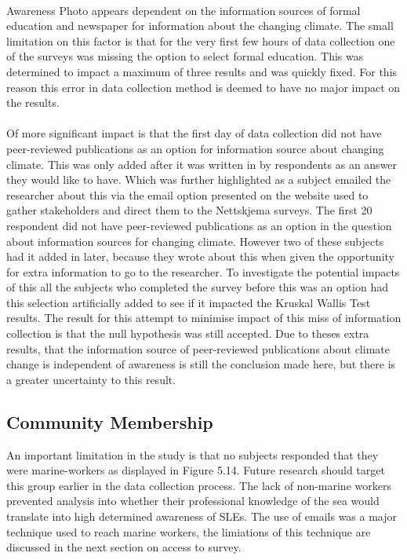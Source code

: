 \paragraph{}
Awareness Photo appears dependent on the information sources of formal education and newspaper for information about the changing climate. The small limitation on this factor is that for the very first few hours of data collection one of the surveys was missing the option to select formal education. This was determined to impact a maximum of three results and was quickly fixed. For this reason this error in data collection method is deemed to have no major impact on the results. 
\paragraph{}
Of more significant impact is that the first day of data collection did not have peer-reviewed publications as an option for information source about changing climate. This was only added after it was written in by respondents as an answer they would like to have. Which was further highlighted as a subject emailed the researcher about this via the email option presented on the website used to gather stakeholders and direct them to the Nettskjema surveys.  The first 20 respondent did not have peer-reviewed publications as an option in the question about information sources for changing climate. However two of these subjects had it added in later, because they wrote about this when given the opportunity for extra information to go to the researcher. To investigate the potential impacts of this all the subjects who completed the survey before this was an option had this selection artificially added to see if it impacted the Kruskal Wallis Test results. The result for this attempt to minimise impact of this miss of information collection is that the null hypothesis was still accepted. Due to theses extra results, that the information source of peer-reviewed publications about climate change is independent of awareness is still the conclusion made here, but there is a greater uncertainty to this result.
\paragraph{}


\subsection{Community Membership}
An important limitation in the study is that no subjects responded that they were marine-workers as displayed in Figure 5.14. Future research should target this group earlier in the data collection process. The lack of non-marine workers prevented analysis into whether their professional knowledge of the sea would translate into high determined awareness of SLEs. The use of emails was a major technique used to reach marine workers, the limiations of this technique are discussed in the next section on access to survey. 

